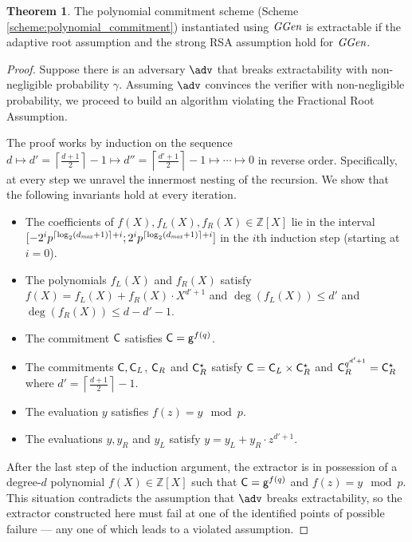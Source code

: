 \documentclass{article}
\theoremstyle{definition}
\newtheorem{theorem}{Theorem}
\newcommand{\alan}[1]{{\todo[color=blue!40!white]{Alan: #1}}}
\newcommand{\alan}[1]{}
\begin{document}
\begin{theorem}
	The polynomial commitment scheme (Scheme \ref{scheme:polynomial_commitment}) instantiated using $\textit{GGen}$ is extractable if the adaptive root assumption and the strong RSA assumption hold for $\textit{GGen}$.
\end{theorem}
\begin{proof}
Suppose there is an adversary $\adv$ that breaks extractability with non-negligible probability $\gamma$. Assuming $\adv$ convinces the verifier with non-negligible probability, we proceed to build an algorithm violating the Fractional Root Assumption.

The proof works by induction on the sequence $d \mapsto d' = \left\lceil \frac{d+1}{2} \right\rceil - 1 \mapsto d'' = \left\lceil \frac{d'+1}{2} \right\rceil - 1 \mapsto \cdots \mapsto 0$ in reverse order. Specifically, at every step we unravel the innermost nesting of the recursion. We show that the following invariants hold at every iteration.
\begin{itemize}
    \itemsep0pt
    \item The coefficients of $f(X), f_L(X), f_R(X) \in \mathbb{Z}[X]$ lie in the interval $[-2^ip^{\lceil \log_2(d_{\it max} + 1) \rceil+i}; 2^ip^{\lceil \log_2(d_{\it max} + 1) \rceil+i}]$ in the $i$th induction step (starting at $i=0$).
    \item The polynomials $f_L(X)$ and $f_R(X)$ satisfy $f(X) = f_L(X) + f_R(X) \cdot X^{d'+1}$ and $\deg(f_L(X)) \leq d'$ and $\deg(f_R(X)) \leq d - d' - 1$.
    \item The commitment $\mathsf{C}$ satisfies $\mathsf{C} = \mathsf{g}^{f(q)}$.
    \item The commitments $\mathsf{C}, \mathsf{C}_L$, $\mathsf{C}_R$ and $\mathsf{C}_R^\star$ satisfy $\mathsf{C} = \mathsf{C}_L \times \mathsf{C}_R^\star$ and $\mathsf{C}_R^{q^{d'+1}} = \mathsf{C}_R^\star$ where $d' = \left\lceil \frac{d+1}{2} \right\rceil - 1$.
    \item The evaluation $y$ satisfies $f(z) = y \mod p$.
    \item The evaluations $y, y_R$ and $y_L$ satisfy $y = y_L + y_R \cdot z^{d'+1}$.
\end{itemize}

After the last step of the induction argument, the extractor is in possession of a degree-$d$ polynomial $f(X) \in \mathbb{Z}[X]$ such that $\mathsf{C} = \mathsf{g}^{f(q)}$ and $f(z) = y \mod p$. This situation contradicts the assumption that $\adv$ breaks extractability, so the extractor constructed here must fail at one of the identified points of possible failure --- any one of which leads to a violated assumption.


\end{proof}
\end{document}
